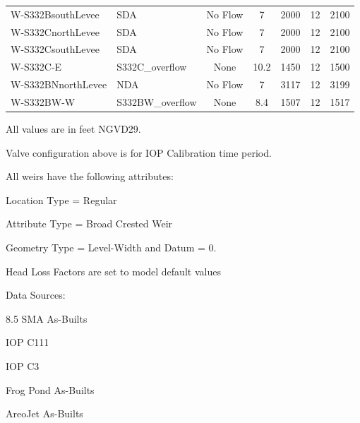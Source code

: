 \begin{table}[!h]
\begin{tabular}{llccccc}
W-S332BsouthLevee & SDA              & No Flow   &  7      & 2000    & 12    & 2100  \\
W-S332CnorthLevee & SDA              & No Flow   &  7      & 2000    & 12    & 2100  \\
W-S332CsouthLevee & SDA              & No Flow   &  7      & 2000    & 12    & 2100  \\
W-S332C-E         & S332C\_overflow  & None      &  10.2   & 1450    & 12    & 1500  \\
W-S332BNnorthLevee& NDA              & No Flow   &  7      & 3117    & 12    & 3199  \\
W-S332BW-W        & S332BW\_overflow & None      &  8.4    & 1507    & 12    & 1517  \\
\hline
\end{tabular}

All values are in feet NGVD29.

Valve configuration above is for IOP Calibration time period.

All weirs have the following attributes:
\begin{packed_items}
\item Location Type = Regular
\item Attribute Type = Broad Crested Weir
\item Geometry Type = Level-Width and Datum = 0.
\item Head Loss Factors are set to model default values
\end{packed_items}

Data Sources:
\begin{packed_items}
\item 8.5 SMA As-Builts
\item IOP C111
\item IOP C3
\item Frog Pond As-Builts
\item AreoJet As-Builts
\end{packed_items}

\end{table}

\clearpage

